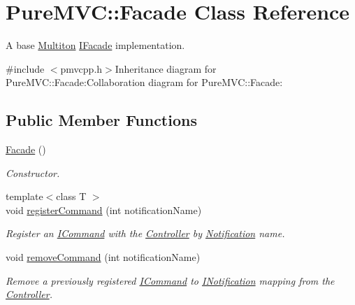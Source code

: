 \hypertarget{class_pure_m_v_c_1_1_facade}{
\section{PureMVC::Facade Class Reference}
\label{class_pure_m_v_c_1_1_facade}
}


A base \hyperlink{class_pure_m_v_c_1_1_multiton}{Multiton} {\ttfamily \hyperlink{class_pure_m_v_c_1_1_i_facade}{IFacade}} implementation.  


{\ttfamily \#include $<$pmvcpp.h$>$}Inheritance diagram for PureMVC::Facade:Collaboration diagram for PureMVC::Facade:\subsection*{Public Member Functions}
\begin{DoxyCompactItemize}
\item 
\hyperlink{class_pure_m_v_c_1_1_facade_a8e0f43c604499d9d603236929b3ac488}{Facade} ()
\begin{DoxyCompactList}\small\item\em Constructor. \item\end{DoxyCompactList}\item 
{\footnotesize template$<$class T $>$ }\\void \hyperlink{class_pure_m_v_c_1_1_facade_ab89d2e427b3936fc6c57be7a9f25b3d1}{registerCommand} (int notificationName)
\begin{DoxyCompactList}\small\item\em Register an {\ttfamily \hyperlink{class_pure_m_v_c_1_1_i_command}{ICommand}} with the {\ttfamily \hyperlink{class_pure_m_v_c_1_1_controller}{Controller}} by \hyperlink{class_pure_m_v_c_1_1_notification}{Notification} name. \item\end{DoxyCompactList}\item 
void \hyperlink{class_pure_m_v_c_1_1_facade_aa99976fe908bef0b08642906b02e2af3}{removeCommand} (int notificationName)
\begin{DoxyCompactList}\small\item\em Remove a previously registered {\ttfamily \hyperlink{class_pure_m_v_c_1_1_i_command}{ICommand}} to {\ttfamily \hyperlink{class_pure_m_v_c_1_1_i_notification}{INotification}} mapping from the \hyperlink{class_pure_m_v_c_1_1_controller}{Controller}. \item\end{DoxyCompactList}\item 

\end{DoxyCompactItemize}
